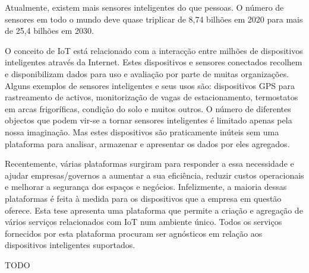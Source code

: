 \begin{abstractotherlanguage}

Atualmente, existem mais sensores inteligentes do que pessoas. O número de sensores em todo o mundo deve quase triplicar de 8,74 bilhões em 2020 para mais de 25,4 bilhões em 2030.

O conceito de \gls{IoT} está relacionado com a interacção entre milhões de dispositivos inteligentes através da Internet. Estes dispositivos e sensores conectados recolhem e disponibilizam dados para uso e avaliação por parte de muitas organizações.
Alguns exemplos de sensores inteligentes e seus usos são: dispositivos GPS para rastreamento de activos, monitorização de vagas de estacionamento, termostatos em arcas frigoríficas, condição do solo e muitos outros. O número de diferentes objectos que podem vir-se a tornar sensores inteligentes é limitado apenas pela nossa imaginação. Mas estes dispositivos são praticamente inúteis sem uma plataforma para analisar, armazenar e apresentar os dados por eles agregados.

Recentemente, várias plataformas surgiram para responder a essa necessidade e ajudar empresas/governos a aumentar a sua eficiência, reduzir custos operacionais e melhorar a segurança dos espaços e negócios. Infelizmente, a maioria dessas plataformas é feita à medida para os dispositivos que a empresa em questão oferece. Esta tese apresenta uma plataforma que permite a criação e agregação de vários serviços relacionados com \gls{IoT} num ambiente único. Todos os serviços fornecidos por esta plataforma procuram ser agnósticos em relação aos dispositivos inteligentes suportados.

\end{abstractotherlanguage}


\begin{acknowledgements}

TODO

\end{acknowledgements}


